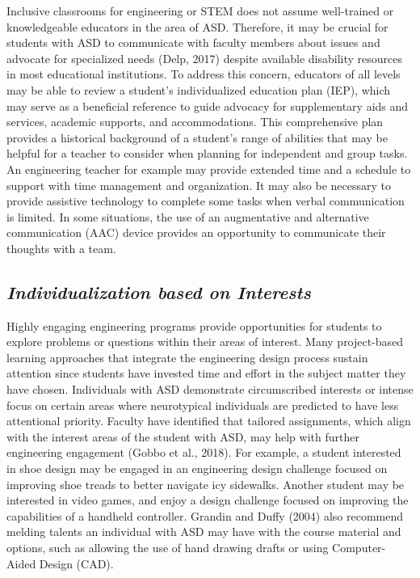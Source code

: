 \documentclass[11.5pt]{sig-alternate}
\begin{document}
\begin{large}
Inclusive classrooms for engineering or STEM does not assume well-trained or knowledgeable educators in the area of ASD. Therefore, it may be crucial for students with ASD to communicate with faculty members about issues and advocate for specialized needs (Delp, 2017) despite available disability resources in most educational institutions. To address this concern, educators of all levels may be able to review a student’s individualized education plan (IEP), which may serve as a beneficial reference to guide advocacy for supplementary aids and services, academic supports, and accommodations. This comprehensive plan provides a historical background of a student’s range of abilities that may be helpful for a teacher to consider when planning for independent and group tasks. An engineering teacher for example may provide extended time and a schedule to support with time management and organization. It may also be necessary to provide assistive technology to complete some tasks when verbal communication is limited. In some situations, the use of an augmentative and alternative communication (AAC) device provides an opportunity to communicate their thoughts with a team.

\subsection*{\textbf{\textit{Individualization based on Interests}}}

Highly engaging engineering programs provide opportunities for students to explore problems or questions within their areas of interest. Many project-based learning approaches that integrate the engineering design process sustain attention since students have invested time and effort in the subject matter they have chosen. Individuals with ASD demonstrate circumscribed interests or intense focus on certain areas where neurotypical individuals are predicted to have less attentional priority. Faculty have identified that tailored assignments, which align with the interest areas of the student with ASD, may help with further engineering engagement (Gobbo et al., 2018). For example, a student interested in shoe design may be engaged in an engineering design challenge focused on improving shoe treads to better navigate icy sidewalks. Another student may be interested in video games, and enjoy a design challenge focused on improving the capabilities of a handheld controller. Grandin and Duffy (2004) also recommend melding talents an individual with ASD may have with the course material and options, such as allowing the use of hand drawing drafts or using Computer-Aided Design (CAD).


\end{large}
\end{document}
